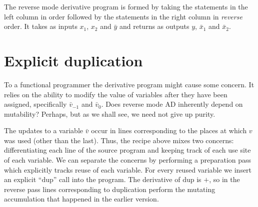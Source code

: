 \documentclass[12pt]{article}
\newcommand{\dup}{\mathrm{dup}}
\begin{document}
The reverse mode derivative program is formed by taking the statements
in the left column in order followed by the statements in the right
column in \emph{reverse} order.  It takes as inputs $x_1$, $x_2$ and
$\bar{y}$ and returns as outputs $y$, $\bar{x}_1$ and $\bar{x}_2$.

\section{Explicit duplication}

To a functional programmer the derivative program might cause some
concern.  It relies on the ability to modify the value of variables
after they have been assigned, specifically \(\bar{v}_{-1}\) and
\(\bar{v}_0\).  Does reverse mode AD inherently depend on mutability?
Perhaps, but as we shall see, we need not give up purity.

The updates to a variable $\bar{v}$ occur in lines corresponding to
the places at which $v$ was used (other than the last). Thus, the
recipe above mixes two concerns: differentiating each line of the
source program and keeping track of each use site of each variable.
We can separate the concerns by performing a preparation pass which
explicitly tracks reuse of each variable.  For every reused variable
we insert an explicit ``$\dup$'' call into the program.  The
derivative of $\dup$ is $+$, so in the reverse pass lines
corresponding to duplication perform the mutating accumulation that
happened in the earlier version.
\end{document}
